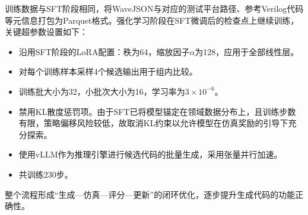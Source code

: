 训练数据与SFT阶段相同，将WaveJSON与对应的测试平台路径、参考Verilog代码等元信息打包为Parquet格式。强化学习阶段在SFT微调后的检查点上继续训练，关键超参数设置如下：
\begin{itemize}
  \item 沿用SFT阶段的LoRA配置：秩为64，缩放因子$\alpha$为128，应用于全部线性层。
  \item 对每个训练样本采样4个候选输出用于组内比较。
  \item 训练批大小为32，小批次大小为16，学习率为$3 \times 10^{-6}$。
  \item 禁用KL散度惩罚项。由于SFT已将模型锚定在领域数据分布上，且训练步数有限，策略偏移风险较低，故取消KL约束以允许模型在仿真奖励的引导下充分探索。
  \item 使用vLLM作为推理引擎进行候选代码的批量生成，采用张量并行加速。
  \item 共训练230步。
\end{itemize}

整个流程形成“生成—仿真—评分—更新”的闭环优化，逐步提升生成代码的功能正确性。
